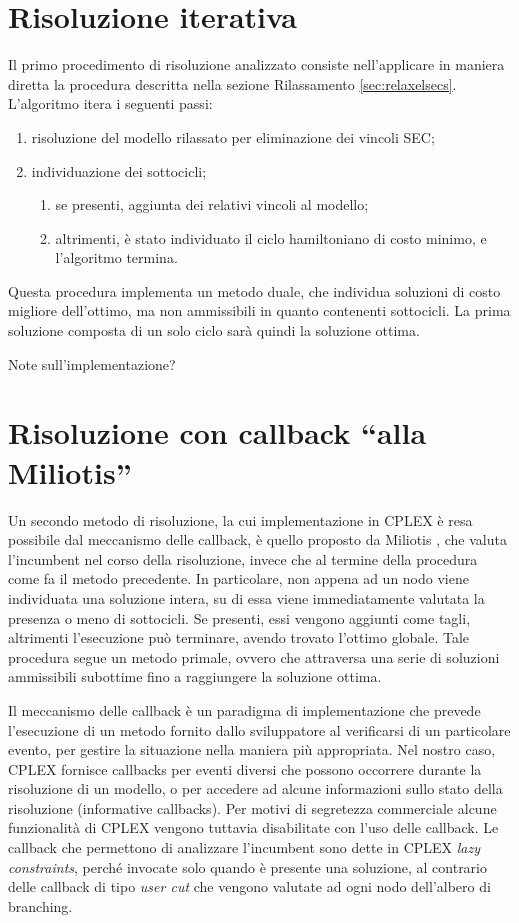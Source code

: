 \section{Risoluzione iterativa}
Il primo procedimento di risoluzione analizzato consiste nell'applicare in maniera diretta la procedura descritta nella sezione Rilassamento \ref{sec:relaxelsecs}. L'algoritmo itera i seguenti passi:
\begin{enumerate}[noitemsep]
  \item risoluzione del modello rilassato per eliminazione dei vincoli SEC;
  \item individuazione dei sottocicli;
  \begin{enumerate}[noitemsep]
    \item se presenti, aggiunta dei relativi vincoli al modello;
    \item altrimenti, è stato individuato il ciclo hamiltoniano di costo minimo, e l'algoritmo termina.
  \end{enumerate}
\end{enumerate}

Questa procedura implementa un metodo duale, che individua soluzioni di costo migliore dell'ottimo, ma non ammissibili in quanto contenenti sottocicli. La prima soluzione composta di un solo ciclo sarà quindi la soluzione ottima.

Note sull'implementazione?

\section{Risoluzione con callback ``alla Miliotis''}
Un secondo metodo di risoluzione, la cui implementazione in CPLEX è resa possibile dal meccanismo delle callback, è quello proposto da Miliotis \citep{miliotis1978using}, che valuta l'incumbent nel corso della risoluzione, invece che al termine della procedura come fa il metodo precedente. In particolare, non appena ad un nodo viene individuata una soluzione intera, su di essa viene immediatamente valutata la presenza o meno di sottocicli. Se presenti, essi vengono aggiunti come tagli, altrimenti l'esecuzione può terminare, avendo trovato l'ottimo globale. Tale procedura segue un metodo primale, ovvero che attraversa una serie di soluzioni ammissibili subottime fino a raggiungere la soluzione ottima.

Il meccanismo delle callback è un paradigma di implementazione che prevede l'esecuzione di un metodo fornito dallo sviluppatore al verificarsi di un particolare evento, per gestire la situazione nella maniera più appropriata. Nel nostro caso, CPLEX fornisce callbacks per eventi diversi che possono occorrere durante la risoluzione di un modello, o per accedere ad alcune informazioni sullo stato della risoluzione (informative callbacks). Per motivi di segretezza commerciale alcune funzionalità di CPLEX vengono tuttavia disabilitate con l'uso delle callback. Le callback che permettono di analizzare l'incumbent sono dette in CPLEX \textit{lazy constraints}, perché invocate solo quando è presente una soluzione, al contrario delle callback di tipo \textit{user cut} che vengono valutate ad ogni nodo dell'albero di branching.

